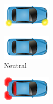 \begin{figure}
\begin{subfigure}{0.1\linewidth}
		 \label{fig:breakinga}
\end{subfigure} 
\begin{subfigure}{0.1\linewidth}
		\centering
		\includegraphics[width=\linewidth]{images/indicating_n}
		\label{fig:indicatingn}
\end{subfigure} 
\begin{subfigure}{0.11\linewidth}
	\centering
	\includegraphics[width=\linewidth]{images/normal_n}
	\caption*{Neutral}
	\label{fig:normaln}
\end{subfigure} 
\begin{subfigure}{0.1\linewidth}
	\centering
	\includegraphics[width=\linewidth]{images/breaking_n}

\end{subfigure}
\end{figure}

